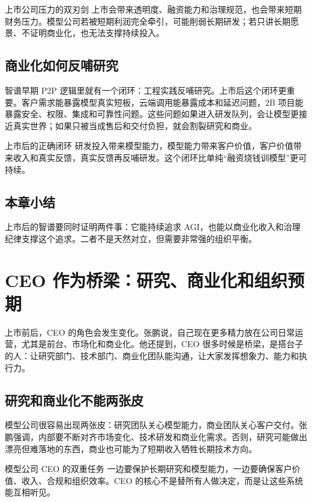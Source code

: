 \documentclass[a4paper]{article}
\begin{document}
\begin{warningbox}{上市公司压力的双刃剑}
上市会带来透明度、融资能力和治理规范，也会带来短期财务压力。模型公司若被短期利润完全牵引，可能削弱长期研发；若只讲长期愿景、不证明商业化，也无法支撑持续投入。
\end{warningbox}

\subsection{商业化如何反哺研究}

智谱早期 P2P 逻辑里就有一个闭环：工程实践反哺研究。上市后这个闭环更重要。客户需求能暴露模型真实短板，云端调用能暴露成本和延迟问题，2B 项目能暴露安全、权限、集成和可靠性问题。这些问题如果进入研发队列，会让模型更接近真实世界；如果只被当成售后和交付负担，就会割裂研究和商业。

\begin{importantbox}{上市后的正确闭环}
研发投入带来模型能力，模型能力带来客户价值，客户价值带来收入和真实反馈，真实反馈再反哺研发。这个闭环比单纯“融资烧钱训模型”更可持续。
\end{importantbox}

\subsection{本章小结}

上市后的智谱要同时证明两件事：它能持续追求 AGI，也能以商业化收入和治理纪律支撑这个追求。二者不是天然对立，但需要非常强的组织平衡。

\section{CEO 作为桥梁：研究、商业化和组织预期}

上市前后，CEO 的角色会发生变化。张鹏说，自己现在更多精力放在公司日常运营，尤其是前台、市场化和商业化。他还提到，CEO 很多时候是桥梁，是搭台子的人：让研究部门、技术部门、商业化团队能沟通，让大家发挥想象力、能力和执行力。

\subsection{研究和商业化不能两张皮}

模型公司很容易出现两张皮：研究团队关心模型能力，商业团队关心客户交付。张鹏强调，内部要不断对齐市场变化、技术研发和商业化需求。否则，研究可能做出漂亮但难落地的东西，商业也可能为了短期收入牺牲长期技术方向。

\begin{importantbox}{模型公司 CEO 的双重任务}
一边要保护长期研究和模型能力，一边要确保客户价值、收入、合规和组织效率。CEO 的核心不是替所有人做决定，而是让这些系统能互相听见。
\end{importantbox}
\end{document}
